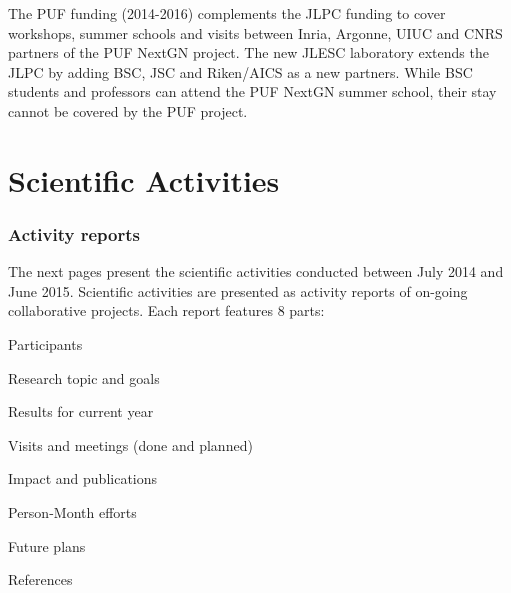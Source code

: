 \documentclass[12pt]{article}
\theoremstyle{definition}
\begin{document}


The PUF funding (2014-2016) complements the JLPC funding to cover workshops, summer schools and visits between Inria, Argonne, UIUC and CNRS partners of the PUF NextGN project. The new JLESC laboratory extends the JLPC by adding BSC, JSC and Riken/AICS as a new partners. While BSC students and professors can attend the PUF NextGN summer school, their stay cannot be covered by the PUF project.

\newpage
\section{Scientific Activities}
\label{sec.science}

\subsubsection*{Activity reports}

The next pages present the scientific activities conducted between July 2014 and June 2015.
Scientific activities are presented as activity reports of on-going collaborative projects.
Each report features 8 parts: 
\begin{compactenum}
\item Participants
\item Research topic and goals
\item Results for current year
\item Visits and meetings (done and planned)
\item Impact and publications
\item Person-Month efforts
\item Future plans
\item References
\end{compactenum}
\end{document}
